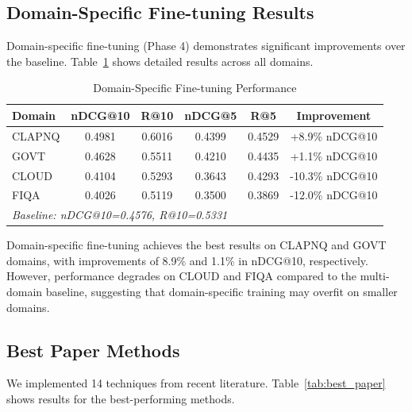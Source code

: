 \documentclass[11pt]{article}
\begin{document}
\subsection{Domain-Specific Fine-tuning Results}

Domain-specific fine-tuning (Phase 4) demonstrates significant improvements over the baseline. Table~\ref{tab:domain_specific} shows detailed results across all domains.

\begin{table}[h]
\centering
\caption{Domain-Specific Fine-tuning Performance}
\label{tab:domain_specific}
\small
\begin{tabular}{lccccc}
\toprule
\textbf{Domain} & \textbf{nDCG@10} & \textbf{R@10} & \textbf{nDCG@5} & \textbf{R@5} & \textbf{Improvement} \\
\midrule
CLAPNQ & 0.4981 & 0.6016 & 0.4399 & 0.4529 & +8.9\% nDCG@10 \\
GOVT & 0.4628 & 0.5511 & 0.4210 & 0.4435 & +1.1\% nDCG@10 \\
CLOUD & 0.4104 & 0.5293 & 0.3643 & 0.4293 & -10.3\% nDCG@10 \\
FIQA & 0.4026 & 0.5119 & 0.3500 & 0.3869 & -12.0\% nDCG@10 \\
\bottomrule
\multicolumn{6}{l}{\textit{Baseline: nDCG@10=0.4576, R@10=0.5331}} \\
\end{tabular}
\end{table}

Domain-specific fine-tuning achieves the best results on CLAPNQ and GOVT domains, with improvements of 8.9\% and 1.1\% in nDCG@10, respectively. However, performance degrades on CLOUD and FIQA compared to the multi-domain baseline, suggesting that domain-specific training may overfit on smaller domains.

\subsection{Best Paper Methods}

We implemented 14 techniques from recent literature. Table~\ref{tab:best_paper} shows results for the best-performing methods.
\end{document}
